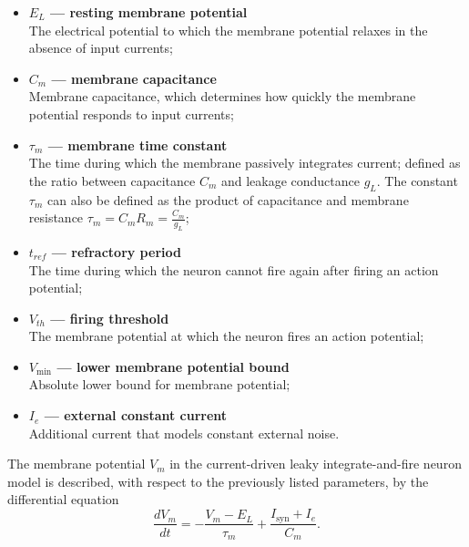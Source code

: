 \documentclass[a4paper,12pt,openright]{book}
\begin{document}
\begin{itemize}
    \item \textbf{$E_L$ --- resting membrane potential} \\
    The electrical potential to which the membrane potential relaxes in the absence of input currents;

    \item \textbf{$C_m$ --- membrane capacitance} \\
    Membrane capacitance, which determines how quickly the membrane potential responds to input currents;

    \item \textbf{$\tau_m$ --- membrane time constant} \\
    The time during which the membrane passively integrates current; defined as the ratio between capacitance $C_m$ and leakage conductance $g_L$. The constant $\tau_m$ can also be defined as the product of capacitance and membrane resistance $\tau_m = C_m R_m = \frac{C_m}{g_L}$;

    \item \textbf{$t_{ref}$ --- refractory period} \\
    The time during which the neuron cannot fire again after firing an action potential;

    \item \textbf{$V_{th}$ --- firing threshold} \\
    The membrane potential at which the neuron fires an action potential;

    \item \textbf{$V_{\min}$ --- lower membrane potential bound} \\
    Absolute lower bound for membrane potential;

    \item \textbf{$I_e$ --- external constant current} \\
    Additional current that models constant external noise.
\end{itemize}
The membrane potential $V_m$ in the current-driven leaky integrate-and-fire neuron model is described, with respect to the previously listed parameters, by the differential equation
\begin{equation*}
    \frac{dV_m}{dt}=-\frac{V_m-E_L}{\tau_m}+\frac{I_{\text{syn}}+I_e}{C_m}.
\end{equation*}
\end{document}

